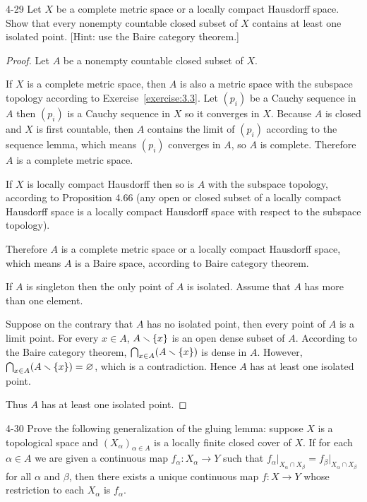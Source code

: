 \begin{problem}{4-29}
Let $X$ be a complete metric space or a locally compact Hausdorff space. Show that every nonempty countable closed subset of $X$ contains at least one isolated point. [Hint: use the Baire category theorem.]
\end{problem}

\begin{proof}
	Let $A$ be a nonempty countable closed subset of $X$.

	If $X$ is a complete metric space, then $A$ is also a metric space with the subspace topology according to Exercise~\ref{exercise:3.3}. Let ${(p_{i})}$ be a Cauchy sequence in $A$ then ${(p_{i})}$ is a Cauchy sequence in $X$ so it converges in $X$. Because $A$ is closed and $X$ is first countable, then $A$ contains the limit of ${(p_{i})}$ according to the sequence lemma, which means ${(p_{i})}$ converges in $A$, so $A$ is complete. Therefore $A$ is a complete metric space.

	If $X$ is locally compact Hausdorff then so is $A$ with the subspace topology, according to Proposition 4.66 (any open or closed subset of a locally compact Hausdorff space is a locally compact Hausdorff space with respect to the subspace topology).

	Therefore $A$ is a complete metric space or a locally compact Hausdorff space, which means $A$ is a Baire space, according to Baire category theorem.

	If $A$ is singleton then the only point of $A$ is isolated. Assume that $A$ has more than one element.

	Suppose on the contrary that $A$ has no isolated point, then every point of $A$ is a limit point. For every $x\in A$, $A\smallsetminus \left\{{x}\right\}$ is an open dense subset of $A$. According to the Baire category theorem, $\bigcap_{x\in A}(A\smallsetminus \left\{{x}\right\})$ is dense in $A$. However, $\bigcap_{x\in A}(A\smallsetminus \left\{{x}\right\}) = \varnothing$, which is a contradiction. Hence $A$ has at least one isolated point.

	Thus $A$ has at least one isolated point.
\end{proof}

\begin{problem}{4-30}\label{problem:4-30}
Prove the following generalization of the gluing lemma: suppose $X$ is a topological space and ${(X_{\alpha})}_{\alpha\in A}$ is a locally finite closed cover of $X$. If for each $\alpha\in A$ we are given a continuous map $f_{\alpha}: X_{\alpha} \to Y$ such that $f_{\alpha}\vert_{X_{\alpha}\cap X_{\beta}} = f_{\beta}\vert_{X_{\alpha}\cap X_{\beta}}$ for all $\alpha$ and $\beta$, then there exists a unique continuous map $f: X\to Y$ whose restriction to each $X_{\alpha}$ is $f_{\alpha}$.
\end{problem}


